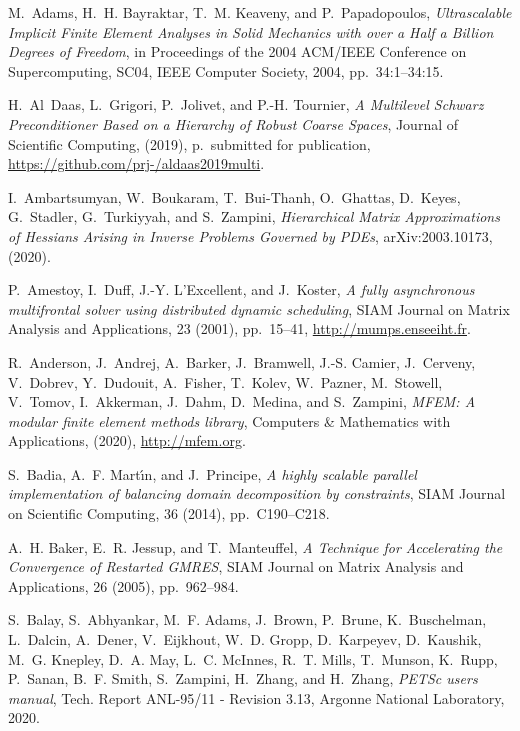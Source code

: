 \documentclass[3p,11pt]{elsarticle}
\begin{document}

\begin{thebibliography}{10}

{\sc M.~Adams, H.~H. Bayraktar, T.~M. Keaveny, and P.~Papadopoulos}, {\em
  {Ultrascalable Implicit Finite Element Analyses in Solid Mechanics with over
  a Half a Billion Degrees of Freedom}}, in Proceedings of the 2004 ACM/IEEE
  Conference on Supercomputing, SC04, IEEE Computer Society, 2004,
  pp.~\mbox{34:1--34:15}.

{\sc H.~Al~Daas, L.~Grigori, P.~Jolivet, and P.-H. Tournier}, {\em {A
  Multilevel Schwarz Preconditioner Based on a Hierarchy of Robust Coarse
  Spaces}}, Journal of Scientific Computing,  (2019), p.~submitted for
  publication, \url{https://github.com/prj-/aldaas2019multi}.

{\sc I.~Ambartsumyan, W.~Boukaram, T.~Bui-Thanh, O.~Ghattas, D.~Keyes,
  G.~Stadler, G.~Turkiyyah, and S.~Zampini}, {\em {Hierarchical Matrix
  Approximations of Hessians Arising in Inverse Problems Governed by PDEs}},
  arXiv:2003.10173,  (2020).

{\sc P.~Amestoy, I.~Duff, J.-Y. L'Excellent, and J.~Koster}, {\em A fully
  asynchronous multifrontal solver using distributed dynamic scheduling}, SIAM
  Journal on Matrix Analysis and Applications, 23 (2001), pp.~15--41,
  \url{http://mumps.enseeiht.fr}.

{\sc R.~Anderson, J.~Andrej, A.~Barker, J.~Bramwell, J.-S. Camier, J.~Cerveny,
  V.~Dobrev, Y.~Dudouit, A.~Fisher, T.~Kolev, W.~Pazner, M.~Stowell, V.~Tomov,
  I.~Akkerman, J.~Dahm, D.~Medina, and S.~Zampini}, {\em {MFEM: A modular
  finite element methods library}}, Computers \& Mathematics with Applications,
   (2020), \url{http://mfem.org}.

{\sc S.~Badia, A.~F. Mart{\'\i}n, and J.~Principe}, {\em A highly scalable
  parallel implementation of balancing domain decomposition by constraints},
  SIAM Journal on Scientific Computing, 36 (2014), pp.~C190--C218.

{\sc A.~H. Baker, E.~R. Jessup, and T.~Manteuffel}, {\em {A Technique for
  Accelerating the Convergence of Restarted GMRES}}, SIAM Journal on Matrix
  Analysis and Applications, 26 (2005), pp.~962--984.

{\sc S.~Balay, S.~Abhyankar, M.~F. Adams, J.~Brown, P.~Brune, K.~Buschelman,
  L.~Dalcin, A.~Dener, V.~Eijkhout, W.~D. Gropp, D.~Karpeyev, D.~Kaushik, M.~G.
  Knepley, D.~A. May, L.~C. McInnes, R.~T. Mills, T.~Munson, K.~Rupp, P.~Sanan,
  B.~F. Smith, S.~Zampini, H.~Zhang, and H.~Zhang}, {\em {PETS}c users manual},
  Tech. Report ANL-95/11 - Revision 3.13, Argonne National Laboratory, 2020.


\end{thebibliography}
\end{document}
